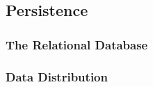 \subsection{Persistence}

\subsubsection{The Relational Database}

\subsubsection{Data Distribution}